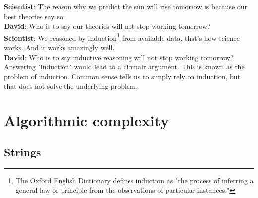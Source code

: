 \documentclass[oneside,hidelinks]{article}
\begin{document}
{\setlength\parindent{0pt}
\textbf{Scientist}: The reason why we predict the sun will rise tomorrow is because our best theories say so.  \\

\textbf{David}: Who is to say our theories will not stop working tomorrow?  \\

\textbf{Scientist}: We reasoned by induction\footnote{The Oxford English Dictionary defines induction as "the process of inferring a general law or principle from the observations of particular instances."} from available data, that's how science works. And it works amazingly well.  \\

\textbf{David}: Who is to say inductive reasoning will not stop working tomorrow?  \\

Answering "induction" would lead to a circualr argument.
This is known as the problem of induction.
Common sense tells us to simply rely on induction, but that does not solve the underlying problem.
}

\newpage

\section{Algorithmic complexity}

\subsection{Strings}
\end{document}
